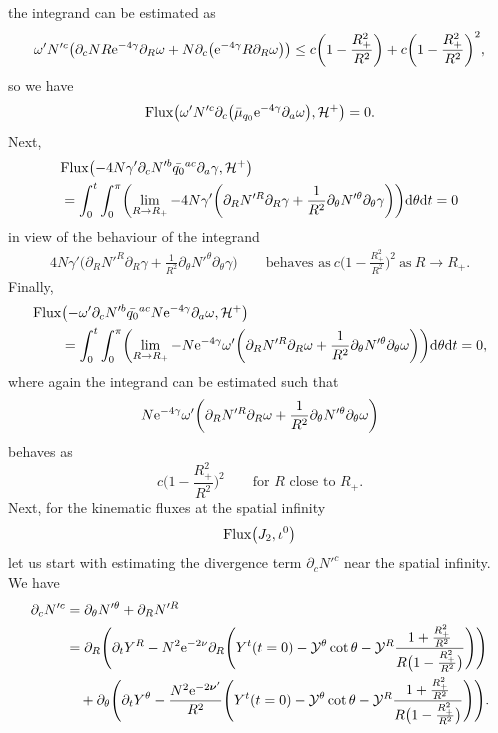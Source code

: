 \documentclass[11pt]{article}
\numberwithin{equation}{section}
\def\ptl{\partial}%
\def\mbo#1{\boldsymbol{#1}}%
\numberwithin{equation}{section}
\begin{document}
the integrand can be estimated as
\begin{align*}
\omega' N'^c \bigl(\ptl_c N R {\rm e}^{-4\gamma} \ptl_R \omega + N \ptl_c \bigl({\rm e}^{-4\gamma} R \ptl_R \omega\bigr)\bigr) \leq c \biggl(1- \frac{R^2_+}{R^2}\biggr) + c \biggl(1- \frac{R^2_+}{R^2}\biggr)^2,
\end{align*}
so we have
\begin{align*}
{\rm Flux} \bigl(\omega' N'^c \ptl_c \bigl(\bar{\mu}_{q_0} {\rm e}^{-4\gamma} \ptl_a \omega\bigr), \mathcal{H}^+\bigr) =0.
\end{align*}
Next,
\begin{align*}
& {\rm Flux} \bigl(-4 N \gamma' \ptl_c N'^b \bar{q_0}^{ac} \ptl_a \gamma, \mathcal{H}^+\bigr) \notag\\
&{}= \int^t_0 \int^\pi_0 \biggl(\lim_{R \to R_+} -4 N \gamma' \biggl(\ptl_R N'^R \ptl_R \gamma + \frac{1}{R^2} \ptl_\theta N'^ \theta \ptl_ \theta \gamma\biggr) \biggr) {\rm d}\theta {\rm d}t
 =0
\end{align*}
in view of the behaviour of the integrand
\begin{align*}
 4 N \gamma' \biggl(\ptl_R N'^R \ptl_R \gamma + \frac{1}{R^2} \ptl_\theta N'^ \theta \ptl_ \theta \gamma\biggr) \qquad \text{behaves as} \ c\biggl(1- \frac{R^2_+}{R^2}\biggr)^2 \ \text{as} \ R \to R_+.
\end{align*}
Finally,
\begin{align*}
& {\rm Flux} \bigl(-\omega' \ptl_c N'^b \bar{q_0}^{ac} N {\rm e}^{-4\gamma} \ptl_a \omega, \mathcal{H}^+\bigr) \notag \\
 &{}\qquad{}= \int^t_0 \int^\pi_0 \biggl(\lim_{R \to R_+} - N {\rm e}^{-4 \gamma} \omega' \biggl(\ptl_R N'^R \ptl_R \omega + \frac{1}{R^2} \ptl_\theta N'^\theta \ptl_\theta \omega\biggr) \biggr) {\rm d}\theta {\rm d}t
= 0,
\end{align*}
where again the integrand can be estimated such that
\[
N {\rm e}^{-4 \gamma} \omega' \biggl(\ptl_R N'^R \ptl_R \omega + \frac{1}{R^2} \ptl_\theta N'^\theta \ptl_\theta \omega\biggr)
\]
behaves as
\[
 c\biggl(1- \frac{R^2_+}{R^2}\biggr)^2 \qquad \text{for $R$ close to $R_+$}.
\]
Next, for the kinematic fluxes at the spatial infinity
\begin{align*}
{\rm Flux}\bigl(J_2, \iota^0\bigr)
\end{align*}
let us start with estimating the divergence term $\displaystyle \ptl_c N'^c$ near the spatial infinity. We have
\begin{align*}
\ptl_c N'^c &{}= \ptl_\theta N'^ \theta + \ptl_R N'^R \notag\\
&{}= \ptl_R \Biggl(\ptl_t Y^R - N^2 {\rm e}^{-2 \nu} \ptl_R \Biggl(Y^t(t=0) - \mathcal{Y}^ \theta \cot \theta - \mathcal{Y}^R \frac{ 1 + \frac{R^2_+}{R^2}}{ R \bigl(1- \frac{R^2_+}{R^2}\bigr)} \Biggr) \Biggr) \notag \\
&\quad{} + \ptl_\theta \Biggl(\ptl_t Y^\theta - \frac{N^2 {\rm e}^{-2\mbo{\nu}'}}{R^2} \Biggl(Y^t(t=0) - \mathcal{Y}^\theta \cot \theta - \mathcal{Y}^R \frac{ 1 + \frac{R^2_+}{R^2}}{ R \bigl(1- \frac{R^2_+}{R^2}\bigr)}\Biggr)\Biggr).
\end{align*}
\end{document}
